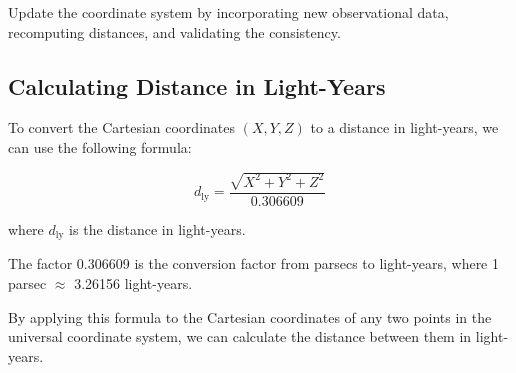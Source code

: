 \documentclass{article}
\begin{document}
Update the coordinate system by incorporating new observational data, recomputing distances, and validating the consistency.

\subsection*{Calculating Distance in Light-Years}

To convert the Cartesian coordinates $(X, Y, Z)$ to a distance in light-years, we can use the following formula:

\begin{equation}
d_\text{ly} = \frac{\sqrt{X^2 + Y^2 + Z^2}}{0.306609}
\end{equation}

where $d_\text{ly}$ is the distance in light-years.

The factor 0.306609 is the conversion factor from parsecs to light-years, where 1 parsec $\approx$ 3.26156 light-years.

By applying this formula to the Cartesian coordinates of any two points in the universal coordinate system, we can calculate the distance between them in light-years.
\end{document}

